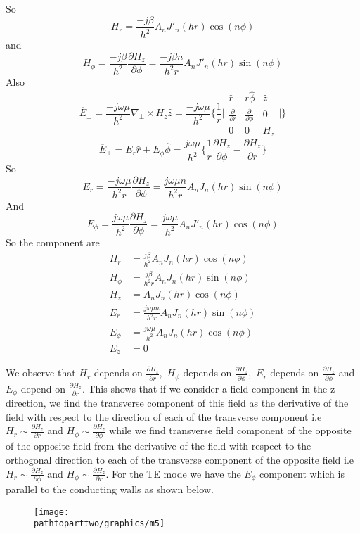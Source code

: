 So 
$$H_r = \frac{-j\beta}{h^2}A_nJ'_n(hr)\cos(n\phi)$$
and
$$ H_\phi = \frac{-j\beta}{h^2}\frac{\partial H_z}{\partial \phi} =  \frac{-j\beta n}{h^2 r}A_nJ'_n(hr)\sin(n\phi)$$	 	
Also
\begin{dmath} 
\overline{E}_\perp = \frac{-j\omega\mu}{h^2}\nabla_\perp\times H_z\hat{z}
=\frac{-j\omega\mu}{h^2}
\bigg\{ 
\frac{1}{r}
\bigg|
\begin{matrix}
\hat{r} &  r\hat{\phi}  &  \hat{z}\\ 
\frac{\partial}{\partial r}  &  \frac{\partial}{\partial \phi}  &  0\\
0  &  0  &  H_z
\end{matrix}
\bigg| 
\bigg\}
\end{dmath}
\begin{dmath}
\overline{E}_\perp = E_r\hat{r} + E_\phi\hat{\phi} = \frac{j\omega\mu}{h^2} \bigg \{ \frac{1}{r}\frac{\partial H_z}{\partial \phi} - \frac{\partial H_z}{\partial r}\bigg\}
\end{dmath}
So 
$$ E_r = \frac{-j\omega\mu}{h^2 r}\frac{\partial H_z}{\partial \phi} = \frac{j\omega\mu n}{h^2 r}A_nJ_n(hr)\sin(n\phi)$$
And
$$ E_\phi = \frac{j\omega\mu}{h^2 }\frac{\partial H_z}{\partial \phi} = \frac{j\omega\mu }{h^2 }A_nJ'_n(hr)\cos(n\phi)$$
So the component are
\begin{align*}
H_r &= \frac{j\beta}{h^2 }A_nJ_n(hr)\cos(n\phi)\\ H_\phi &= \frac{j\beta}{h^2 r}A_nJ_n(hr)\sin(n\phi)\\
H_z &= A_nJ_n(hr)\cos(n\phi)\\
E_r &= \frac{j\omega\mu n}{h^2 r}A_nJ_n(hr)\sin(n\phi)\\
E_\phi &= \frac{j\omega\mu }{h^2 }A_nJ_n(hr)\cos(n\phi)\\
E_z & = 0
\end{align*}

We observe that $H_r$ depends on $\frac{\partial H_z}{\partial r},$ $H_\phi$ depends on $\frac{\partial H_z}{\partial \phi},$  $E_r$ depends on $\frac{\partial H_z}{\partial \phi}$ and $E_\phi$ depend on $\frac{\partial H_z}{\partial r}$. This shows that if we consider a field component in the z direction, we find the transverse component of this field as the derivative of the field with respect to the direction of each of the transverse component i.e $H_r \sim \frac{\partial H_z}{\partial r}$ and $H_\phi \sim \frac{\partial H_z}{\partial \phi}$  while we find transverse field component of the opposite of the opposite field from the derivative of the field with respect to the orthogonal direction to each of the transverse 	component of the opposite field i.e $H_r \sim \frac{\partial H_z}{\partial \phi}$ and $H_\phi \sim \frac{\partial H_z}{\partial r}$.     
For the TE mode we have the $E_\phi$ component  which is parallel to the conducting walls as shown below.
\begin{figure}[h]
\centering
\texttt{[image: \\pathtoparttwo/graphics/m5]}
\label{fig:m5}
\end{figure}

